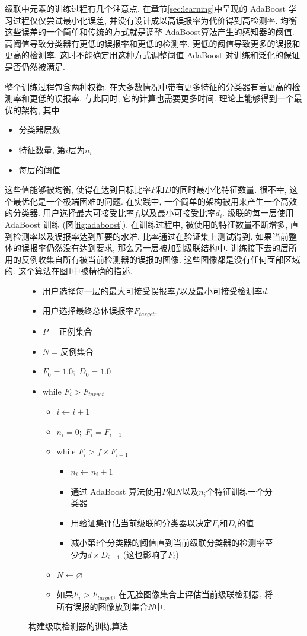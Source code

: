 \documentclass[a4paper,utf8,11pt, onecolumn]{ctexart}
\begin{document}
级联中元素的训练过程有几个注意点. 在章节\ref{sec:learning}中呈现的 AdaBoost 学习过程仅仅尝试最小化误差, 并没有设计成以高误报率为代价得到高检测率. 均衡这些误差的一个简单和传统的方式就是调整 AdaBoost算法产生的感知器的阈值. 高阈值导致分类器有更低的误报率和更低的检测率. 更低的阈值导致更多的误报和更高的检测率. 这时不能确定用这种方式调整阈值 AdaBoost 对训练和泛化的保证是否仍然被满足.

整个训练过程包含两种权衡. 在大多数情况中带有更多特征的分类器有着更高的检测率和更低的误报率. 与此同时, 它的计算也需要更多时间. 理论上能够得到一个最优的架构, 其中
\begin{itemize}
\item 分类器层数
\item 特征数量, 第$i$层为$n_i$
\item 每层的阈值
\end{itemize}
这些值能够被均衡, 使得在达到目标比率$F$和$D$的同时最小化特征数量. 很不幸, 这个最优化是一个极端困难的问题.
在实践中, 一个简单的架构被用来产生一个高效的分类器. 用户选择最大可接受比率$f_i$以及最小可接受比率$d_i$. 级联的每一层使用 AdaBoost 训练 (图\ref{fig:adaboost}). 在训练过程中, 被使用的特征数量不断增多, 直到检测率以及误报率达到所要的水准. 比率通过在验证集上测试得到. 如果当前整体的误报率仍然没有达到要求, 那么另一层被加到级联结构中. 训练接下去的层所用的反例收集自所有被当前检测器的误报的图像. 这些图像都是没有任何面部区域的. 这个算法在图\ref{fig:train}中被精确的描述.
\begin{figure}[!htb]
  \caption{构建级联检测器的训练算法}
  \label{fig:train}
  \kaishu{}
  \begin{itemize}
  \item 用户选择每一层的最大可接受误报率$f$以及最小可接受检测率$d$.
  \item 用户选择最终总体误报率$F_{target}$.
  \item $P=$正例集合
  \item $N=$反例集合
  \item $F_0=1.0;\;D_0=1.0$
  \item while $F_i>F_{target}$
    \begin{itemize}
    \item $i\leftarrow i+1$
    \item $n_i=0;\;F_i=F_{i-1}$
    \item while $F_i>f\times F_{i-1}$
      \begin{itemize}
      \item $n_i\leftarrow n_i+1$
      \item 通过 AdaBoost 算法使用$P$和$N$以及$n_i$个特征训练一个分类器
      \item 用验证集评估当前级联的分类器以决定$F_i$和$D_i$的值
      \item 减小第$i$个分类器的阈值直到当前级联分类器的检测率至少为$d\times D_{i-1}$ (这也影响了$F_i$)
      \end{itemize}
    \item $N\leftarrow\varnothing$
    \item 如果$F_i>F_{target}$, 在无脸图像集合上评估当前级联检测器, 将所有误报的图像放到集合$N$中.
    \end{itemize}
\end{itemize}
\end{figure}
\end{document}
